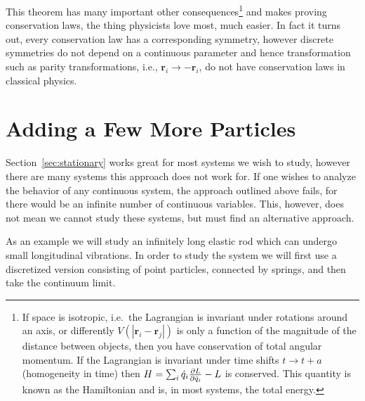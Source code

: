 This theorem has many important other consequences\footnote{If space is
    isotropic, i.e.\ the Lagrangian is invariant under rotations around an axis, or
    differently \(V(|\mathbf{r}_i - \mathbf{r}_j|)\) is only a function of the
    magnitude of the distance between objects, then you have conservation of total
    angular momentum. If the Lagrangian is invariant under time shifts
    \(t\to t + a\) (homogeneity in time) then \(H = \sum_i\dot{q}_i\pdv{L}{\dot{q}_i} - L\)
    is conserved. This quantity is known as the Hamiltonian and is, in most systems,
    the total energy.} and makes proving conservation laws, the thing physicists
love most, much easier. In fact it turns out, every conservation law has a
corresponding symmetry, however discrete symmetries do not depend on a
continuous parameter and hence transformation such as parity transformations,
i.e.,  \(\mathbf{r}_i\to-\mathbf{r}_i\), do not have conservation laws in
classical physics.

\section{Adding a Few More Particles}\label{moreParticles}
Section~\ref{sec:stationary} works great for most systems we wish to study,
however there are many systems this approach does not work for. If one wishes to
analyze the behavior of any continuous system, the approach outlined above
fails, for there would be an infinite number of continuous variables. This,
however, does not mean we cannot study these systems, but must find an
alternative approach.

As an example we will study an infinitely long elastic rod which can undergo
small longitudinal vibrations. In order to study the system we will first use a
discretized version consisting of point particles, connected by springs, and
then take the continuum limit.

